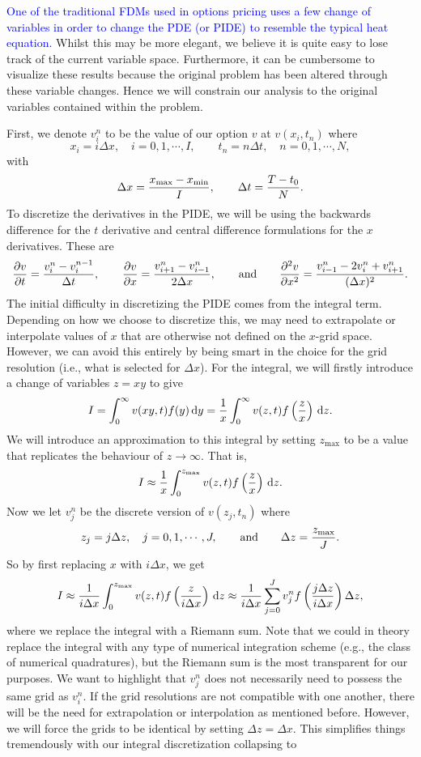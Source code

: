 \textcolor{blue}{One of the traditional FDMs used in options pricing uses a few change of variables in order to change the PDE (or PIDE) to resemble the typical heat equation.} Whilst this may be more elegant, we believe it is quite easy to lose track of the current variable space. Furthermore, it can be cumbersome to visualize these results because the original problem has been altered through these variable changes. Hence we will constrain our analysis to the original variables contained within the problem.

First, we denote $v_i^n$ to be the value of our option $v$ at $v(x_i,t_n)$ where
	$$
		x_i = i\Delta x, \quad i = 0,1,\cdots,I,
		\qquad
		t_n = n\Delta t, \quad n = 0,1,\cdots,N,
	$$
with 
	$$
		\Delta x = \frac{x_{\text{max}}-x_{\text{min}}}{I}, \qquad \Delta t = \frac{T-t_0}{N}.
	$$
To discretize the derivatives in the PIDE, we will be using the backwards difference for the $t$ derivative and central difference formulations for the $x$ derivatives. These are
	$$
		\frac{\partial v}{\partial t} = \frac{v_i^n - v_i^{n-1}}{\Delta t},
		\qquad
		\frac{\partial v}{\partial x} = \frac{ v_{i+1}^n - v_{i-1}^n}{2\Delta x}, \qquad \text{and} \qquad
		\frac{\partial^2 v}{\partial x^2} = \frac{v_{i-1}^n - 2v_i^n + v_{i+1}^n}{(\Delta x)^2}.
	$$
The initial difficulty in discretizing the PIDE comes from the integral term. Depending on how we choose to discretize this, we may need to extrapolate or interpolate values of $x$ that are otherwise not defined on the $x$-grid space. However, we can avoid this entirely by being smart in the choice for the grid resolution (i.e., what is selected for $\Delta x$). For the integral, we will firstly introduce a change of variables $z = xy$ to give
	$$
		I = \int_0^\infty v(xy,t)f(y) \, \mathrm d y = \frac{1}{x}\int_0^\infty v(z,t)f\left(\frac{z}{x}\right) \, \mathrm d z.
	$$
We will introduce an approximation to this integral by setting $z_{\text{max}}$ to be a value that replicates the behaviour of $z \rightarrow \infty$. That is,
	$$
		I \approx  \frac{1}{x}\int_0^{z_\text{max}} v(z,t)f\left(\frac{z}{x}\right) \, \mathrm d z.
	$$
Now we let $v_j^n$ be the discrete version of $v(z_j,t_n)$ where
	$$
		z_j = j \Delta z, \quad j = 0,1,\cdots,J, \qquad \text{and} \qquad \Delta z = \frac{z_\text{max}}{J}.
	$$
So by first replacing $x$ with $i \Delta x$, we get
	$$
		I \approx  \frac{1}{i\Delta x}\int_0^{z_\text{max}} v(z,t)f\left(\frac{z}{i\Delta x}\right) \, \mathrm d z \approx  \frac{1}{i\Delta x}\sum\limits_{j=0}^J v_j^n f\left( \frac{j\Delta z}{i \Delta x} \right) \Delta z,
	$$
where we replace the integral with a Riemann sum. Note that we could in theory replace the integral with any type of numerical integration scheme (e.g., the class of numerical quadratures), but the Riemann sum is the most transparent for our purposes. We want to highlight that $v_j^n$ does not necessarily need to possess the same grid as $v_i^n$. If the grid resolutions are not compatible with one another, there will be the need for extrapolation or interpolation as mentioned before. However, we will force the grids to be identical by setting $\Delta z = \Delta x$. This simplifies things tremendously with our integral discretization collapsing to
